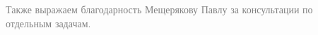 
\begin{flushright}
    \textcolor{gray}{
    \small{Также выражаем благодарность Мещерякову Павлу за консультации по отдельным задачам.}}
\end{flushright}


\newpage

\tableofcontents
\newpage